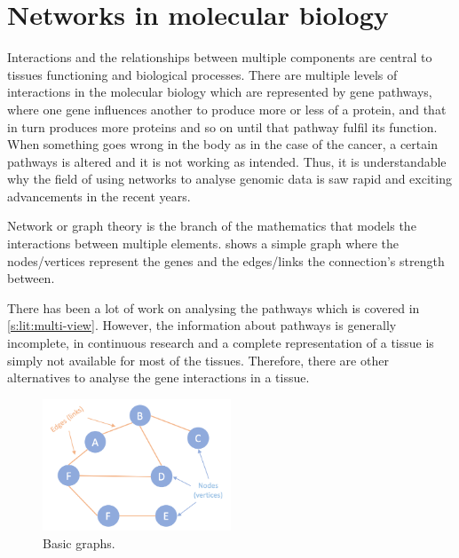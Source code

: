 \section{Networks in molecular biology}

Interactions and the relationships between multiple components are central to tissues functioning and biological processes. There are multiple levels of interactions in the molecular biology which are represented by gene pathways, where one gene influences another to produce more or less of a protein, and that in turn produces more proteins and so on until that pathway fulfil its function. When something goes wrong in the body as in the case of the cancer, a certain pathways is altered and it is not working as intended. Thus, it is understandable why the field of using networks to analyse genomic data is saw rapid and exciting advancements in the recent years. 
 
Network or graph theory is the branch of the mathematics that models the interactions between multiple elements.  shows a simple graph where the nodes/vertices represent the genes and the edges/links the connection's strength between.

There has been a lot of work on analysing the pathways which is covered in \cref{s:lit:multi-view}. However, the information about pathways is generally incomplete, in continuous research and a complete representation of a tissue is simply not available for most of the tissues. Therefore, there are other alternatives to analyse the gene interactions in a tissue.

\begin{figure}[!htb]
  \centering\includegraphics[width=0.5\textwidth,height=0.5\textheight,keepaspectratio]{Sections/Lit_review/Resources/basic_graphs.png}
    \caption{Basic graphs.}
    \label{fig:lit:basic_net}
\end{figure}
\FloatBarrier



